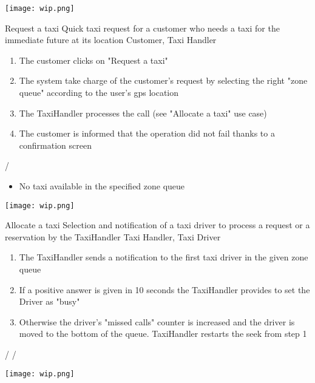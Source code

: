\pagebreak
\texttt{[image: wip.png]}

\usecase
{Request a taxi}
{Quick taxi request for a customer who needs a taxi for the immediate future at its location}
{Customer, Taxi Handler}
{
\begin{enumerate}
	\item The customer clicks on "Request a taxi"
	\item The system take charge of the customer's request by selecting the right "zone queue" according to the user's gps location
	\item The TaxiHandler processes the call (see "Allocate a taxi" use case)
	\item The customer is informed that the operation did not fail thanks to a confirmation screen
\end{enumerate}
}
{
/
}
{ 
\begin{itemize}
\item No taxi available in the specified zone queue
\end{itemize}
}

\pagebreak
\texttt{[image: wip.png]}

\usecase
{Allocate a taxi}
{Selection and notification of a taxi driver to process a request or a reservation by the TaxiHandler}
{Taxi Handler, Taxi Driver}
{
\begin{enumerate}
	\item The TaxiHandler sends a notification to the first taxi driver in the given zone queue
	\item If a positive answer is given in 10 seconds the TaxiHandler provides to set the Driver as "busy"
	\item Otherwise the driver's "missed calls" counter is increased and the driver is moved to the bottom of the queue. TaxiHandler restarts the seek from step 1
\end{enumerate}
}
{
/
}
{ 
/
}

\pagebreak
\texttt{[image: wip.png]}